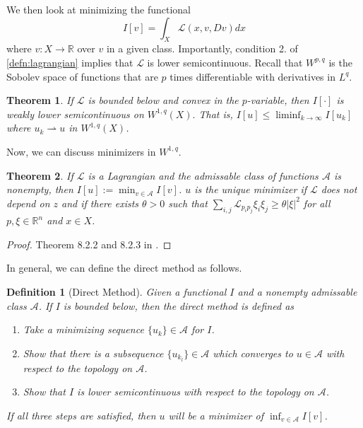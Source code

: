 \documentclass[12pt]{article}
\newcommand{\R}{\mathbb{R}}
\theoremstyle{plain}
\newtheorem{thm}{Theorem}[section]
\newtheorem{defn}{Definition}[section]
\numberwithin{equation}{section}
\begin{document}
We then look at minimizing the functional 
\[I[v] = \int_{X}\mathcal{L}(x,v,Dv)dx\]
where $v : X\to\R$ over $v$ in a given class. Importantly, condition 2. of \autoref{defn:lagrangian} implies that $\mathcal{L}$ is lower semicontinuous. Recall that $W^{p,q}$ is the Sobolev space of functions that are $p$ times differentiable with derivatives in $L^q$.
\begin{thm}
  If $\mathcal{L}$ is bounded below and convex in the $p$-variable, then $I[\cdot]$ is weakly lower semicontinuous on $W^{1,q}(X).$ That is, $I[u] \le \liminf_{k\to\infty} I[u_k]$ where $u_k\rightharpoonup u$ in $W^{1,q}(X)$.
\end{thm}
Now, we can discuss minimizers in $W^{1,q}$.
\begin{thm}
  If $\mathcal{L}$ is a Lagrangian and the admissable class of functions $\mathcal{A}$ is nonempty, then $I[u] := \min_{v\in\mathcal{A}} I[v]$.\newline
  $u$ is the unique minimizer if $\mathcal{L}$ does not depend on $z$ and if there exists $\theta > 0$ such that $\sum_{i,j}\mathcal{L}_{p_ip_j}\xi_i\xi_j\ge \theta|\xi|^2$ for all $p,\xi\in\R^n$ and $x\in X$.
\end{thm}
\begin{proof}
  Theorem 8.2.2 and 8.2.3 in \cite{evans}.
\end{proof}
In general, we can define the direct method as follows.
\begin{defn}[Direct Method]\label{defn:direct}
  Given a functional $I$ and a nonempty admissable class $\mathcal{A}$. If $I$ is bounded below, then the \textit{direct method} is defined as 
  \begin{enumerate}
    \item Take a minimizing sequence $\{u_k\}\in \mathcal{A}$ for $I$.
    \item Show that there is a subsequence $\{u_{k_l}\}\in \mathcal{A}$ which converges to $u\in \mathcal{A}$ with respect to the topology on $\mathcal{A}$.
    \item Show that $I$ is lower semicontinuous with respect to the topology on $\mathcal{A}$.
  \end{enumerate}
  If all three steps are satisfied, then $u$ will be a minimizer of $\inf_{v\in\mathcal{A}} I[v]$.
\end{defn}
\end{document}
